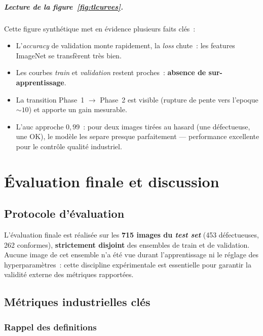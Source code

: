 \documentclass[12pt,a4paper,openany]{report}
\begin{document}
\paragraph{Lecture de la figure~\ref{fig:tlcurves}.}
Cette figure synthétique met en évidence plusieurs faits clés~:
\begin{itemize}
    \item L'\emph{accuracy} de validation monte rapidement, la \emph{loss} chute~: les features ImageNet se transfèrent très bien.
    \item Les courbes \emph{train} et \emph{validation} restent proches~: \textbf{absence de sur-apprentissage}.
    \item La transition Phase~1 $\to$ Phase~2 est visible (rupture de pente vers l'epoque ${\sim}10$) et apporte un gain mesurable.
    \item L'\gls{auc} approche $0{,}99$~: pour deux images tirées au hasard (une défectueuse, une OK), le modèle les separe presque parfaitement --- performance excellente pour le contrôle qualité industriel.
\end{itemize}


\chapter{Évaluation finale et discussion}

\section{Protocole d'évaluation}

L'évaluation finale est réalisée sur les \textbf{715 images du \emph{test set}} (453 défectueuses, 262 conformes), \textbf{strictement disjoint} des ensembles de train et de validation. Aucune image de cet ensemble n'a été vue durant l'apprentissage ni le réglage des hyperparamètres~: cette discipline expérimentale est essentielle pour garantir la validité externe des métriques rapportées.

\section{Métriques industrielles clés}

\subsection{Rappel des definitions}
\end{document}
